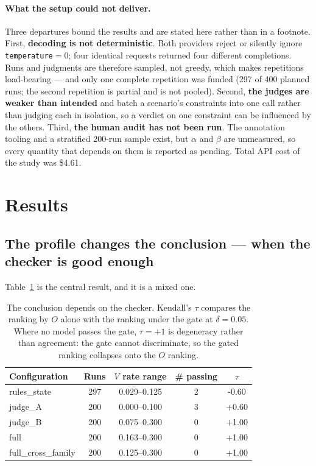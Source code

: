 \documentclass{article}
\begin{document}
\paragraph{What the setup could not deliver.}
Three departures bound the results and are stated here rather than in a footnote. First, \textbf{decoding is not deterministic}. Both providers reject or silently ignore \texttt{temperature}$=0$; four identical requests returned four different completions. Runs and judgments are therefore sampled, not greedy, which makes repetitions load-bearing --- and only one complete repetition was funded (297 of 400 planned runs; the second repetition is partial and is not pooled). Second, \textbf{the judges are weaker than intended} and batch a scenario's constraints into one call rather than judging each in isolation, so a verdict on one constraint can be influenced by the others. Third, \textbf{the human audit has not been run}. The annotation tooling and a stratified 200-run sample exist, but $\alpha$ and $\beta$ are unmeasured, so every quantity that depends on them is reported as pending. Total API cost of the study was \$4.61.

\section{Results}
\label{sec:results}

\subsection{The profile changes the conclusion --- when the checker is good enough}

Table~\ref{tab:configs} is the central result, and it is a mixed one.

\begin{table}[t]
\caption{The conclusion depends on the checker. Kendall's $\tau$ compares the ranking by $O$ alone with the ranking under the gate at $\delta=0.05$. Where no model passes the gate, $\tau=+1$ is degeneracy rather than agreement: the gate cannot discriminate, so the gated ranking collapses onto the $O$ ranking.}
\label{tab:configs}
\vskip 0.1in
\begin{center}\begin{small}
\begin{tabular}{lcccc}
\toprule
Configuration & Runs & $V$ rate range & \# passing & $\tau$ \\
\midrule
rules\_state & 297 & 0.029--0.125 & 2 & -0.60 \\
judge\_A & 200 & 0.000--0.100 & 3 & +0.60 \\
judge\_B & 200 & 0.075--0.300 & 0 & +1.00 \\
full & 200 & 0.163--0.300 & 0 & +1.00 \\
full\_cross\_family & 200 & 0.125--0.300 & 0 & +1.00 \\
\bottomrule
\end{tabular}
\end{small}\end{center}
\vskip -0.1in
\end{table}
\end{document}
